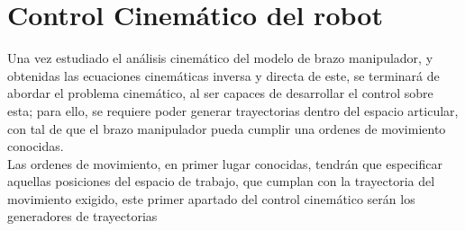 \section{Control Cinemático del robot}
Una vez estudiado el análisis cinemático del modelo de brazo manipulador, y obtenidas las ecuaciones cinemáticas inversa 
y directa de este, se terminará de abordar el problema cinemático, al ser capaces de desarrollar el control sobre esta; para ello, 
se requiere poder generar trayectorias dentro del espacio articular, con tal de que el brazo manipulador pueda cumplir una ordenes de 
movimiento conocidas.\\

Las ordenes de movimiento, en primer lugar conocidas, tendrán que especificar aquellas posiciones del espacio de trabajo,
que cumplan con la trayectoria del movimiento exigido, este primer apartado del control cinemático serán los generadores de trayectorias




